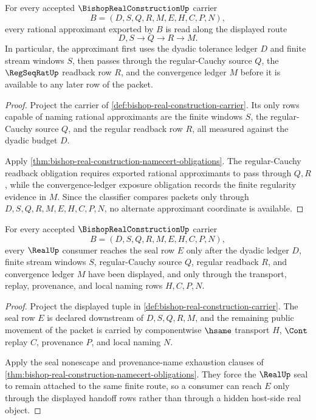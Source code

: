 \begin{theorem}
\label{thm:bishop-real-construction-regular-cauchy-readback}
For every accepted $\BishopRealConstructionUp$ carrier
$$
B=(D,S,Q,R,M,E,H,C,P,N),
$$
every rational approximant exported by $B$ is read along the displayed route
$$
D,S \longrightarrow Q \longrightarrow R \longrightarrow M.
$$
In particular, the approximant first uses the dyadic tolerance ledger $D$ and finite stream windows $S$, then passes through the regular-Cauchy source $Q$, the $\RegSeqRatUp$ readback row $R$, and the convergence ledger $M$ before it is available to any later row of the packet.
\end{theorem}
\begin{proof}
Project the carrier of \autoref{def:bishop-real-construction-carrier}. Its only rows capable of naming rational approximants are the finite windows $S$, the regular-Cauchy source $Q$, and the regular readback row $R$, all measured against the dyadic budget $D$.

Apply \autoref{thm:bishop-real-construction-namecert-obligations}. The regular-Cauchy readback obligation requires exported rational approximants to pass through $Q,R$, while the convergence-ledger exposure obligation records the finite regularity evidence in $M$. Since the classifier compares packets only through $D,S,Q,R,M,E,H,C,P,N$, no alternate approximant coordinate is available.
\end{proof}

\begin{theorem}
\label{thm:bishop-real-construction-real-seal-handoff}
For every accepted $\BishopRealConstructionUp$ carrier
$$
B=(D,S,Q,R,M,E,H,C,P,N),
$$
every $\RealUp$ consumer reaches the seal row $E$ only after the dyadic ledger $D$, finite stream windows $S$, regular-Cauchy source $Q$, regular readback $R$, and convergence ledger $M$ have been displayed, and only through the transport, replay, provenance, and local naming rows $H,C,P,N$.
\end{theorem}
\begin{proof}
Project the displayed tuple in \autoref{def:bishop-real-construction-carrier}. The seal row $E$ is declared downstream of $D,S,Q,R,M$, and the remaining public movement of the packet is carried by componentwise $\hsame$ transport $H$, $\Cont$ replay $C$, provenance $P$, and local naming $N$.

Apply the seal nonescape and provenance-name exhaustion clauses of \autoref{thm:bishop-real-construction-namecert-obligations}. They force the $\RealUp$ seal to remain attached to the same finite route, so a consumer can reach $E$ only through the displayed handoff rows rather than through a hidden host-side real object.
\end{proof}

